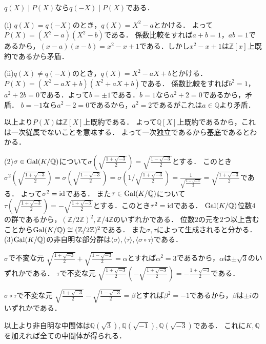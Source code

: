 \documentclass[
		book,
		head_space=20mm,
		foot_space=20mm,
		gutter=10mm,
		line_length=190mm
]{jlreq}
\begin{document}
$q(X)\mid P(X)$なら$q(-X)\mid P(X)$である．

(i) $q(X)=q(-X)$のとき，$q(X)=X^2-a$とかける．
よって$P(X)=(X^2-a)(X^2-b)$である．
係数比較をすれば$a+b=1$，$ab=1$であるから，$(x-a)(x-b)=x^2-x+1$である．しかし$x^2-x+1$は$\mathbb{Z}[x]$上既約であるから矛盾．

(ii)$q(X)\neq q(-X)$のとき，$q(X)=X^2-aX+b$とかける．
$P(X)=(X^2-aX+b)(X^2+aX+b)$である．
係数比較をすれば$b^2=1$，$a^2+2b=0$である．よって$b=\pm 1$である．$b=1$なら$a^2+2=0$であるから，矛盾．
$b=-1$なら$a^2-2=0$であるから，$a^2=2$であるがこれは$a\in \mathbb{Q}$より矛盾．

以上より$P(X)$は$\mathbb{Z}[X]$上既約である．
よって$\mathbb{Q}[X]$上既約であるから，これは一次従属でないことを意味する．
よって一次独立であるから基底であるとわかる．

(2)$\sigma\in \mathop{\mathrm{Gal}}(K/\mathbb{Q})$について$\sigma(\sqrt{\frac{1+\sqrt{-3}}{2}})=\sqrt{\frac{1-\sqrt{-3}}{2}}$とする．
このとき$\sigma^2(\sqrt{\frac{1+\sqrt{-3}}{2}})=\sigma(\sqrt{\frac{1-\sqrt{-3}}{2}})=\sigma(1/\sqrt{\frac{1+\sqrt{-3}}{2}})=\frac{1}{\sqrt{\frac{1-\sqrt{-3}}{2}}}=\sqrt{\frac{1+\sqrt{-3}}{2}}$である．
よって$\sigma^2=\mathop{\mathrm{id}}$である．
また$\tau\in \mathop{\mathrm{Gal}}(K/\mathbb{Q})$について$\tau(\sqrt{\frac{1+\sqrt{-3}}{2}})=-\sqrt{\frac{1+\sqrt{-3}}{2}}$とする．このとき$\tau^2=\mathop{\mathrm{id}}$である．
$\mathop{\mathrm{Gal}}(K/\mathbb{Q})$位数$4$の群であるから，$(\mathbb{Z}/2\mathbb{Z})^2,\mathbb{Z}/4\mathbb{Z}$のいずれかである．
位数$2$の元を$2$つ以上含むことから$\mathop{\mathrm{Gal}}(K/\mathbb{Q})\cong (\mathbb{Z}/2\mathbb{Z})^2$である．
また$\sigma,\tau$によって生成されると分かる．
(3)$\mathop{\mathrm{Gal}}(K/\mathbb{Q})$の非自明な部分群は$\langle \sigma \rangle,\langle \tau \rangle,\langle \sigma\circ\tau \rangle$である．

$\sigma$で不変な元
$\sqrt{\frac{1+\sqrt{-3}}{2}}+\sqrt{\frac{1-\sqrt{-3}}{2}}=\alpha$とすれば$\alpha^2=3$であるから，$\alpha$は$\pm\sqrt{3}$のいずれかである．
$\tau$で不変な元
$\sqrt{\frac{1+\sqrt{-3}}{2}}(-\sqrt{\frac{1+\sqrt{-3}}{2}})=-\frac{1+\sqrt{-3}}{2}$である．

$\sigma\circ\tau$で不変な元
$\sqrt{\frac{1+\sqrt{-3}}{2}}-\sqrt{\frac{1-\sqrt{-3}}{2}}=\beta$とすれば$\beta^2=-1$であるから，$\beta$は$\pm i$のいずれかである．

以上より非自明な中間体は$\mathbb{Q}(\sqrt{3}),\mathbb{Q}(\sqrt{-1}),\mathbb{Q}(\sqrt{-3})$である．
これに$K,\mathbb{Q}$を加えれば全ての中間体が得られる．
\end{document}
